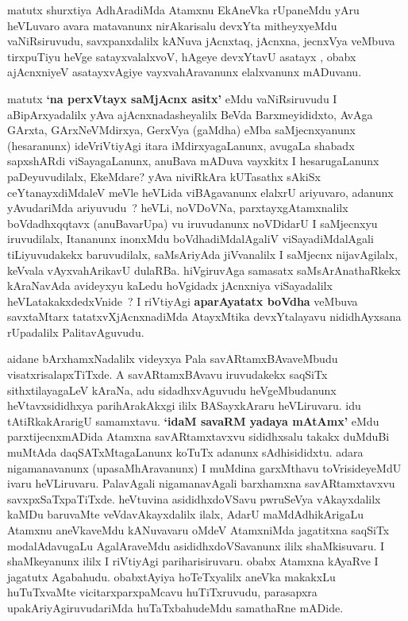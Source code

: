 \begin{artha}
matutx shurxtiya AdhAradiMda Atamxnu EkAneVka rUpaneMdu yAru heVLuvaro avara 
matavanunx nirAkarisalu devxYta mitheyxyeMdu vaNiRsiruvudu, savxpanxdalilx 
kANuva jAcnxtaq, jAcnxna, jecnxVya veMbuva tirxpuTiyu heVge satayxvalalxvoV, 
hAgeye devxYtavU asatayx , obabx ajAcnxniyeV asatayxvAgiye  vayxvahAravanunx 
elalxvanunx mADuvanu. 

matutx \textbf{`na perxVtayx saMjAcnx asitx'} eMdu vaNiRsiruvudu I aBipArxyadalilx \mdash  yAva ajAcnxnadasheyalilx 
BeVda Barxmeyididxto, AvAga GArxta, GArxNeVMdirxya, GerxVya (gaMdha) eMba 
saMjecnxyanunx (hesaranunx) ideVriVtiyAgi itara iMdirxyagaLanunx, avugaLa 
shabadx sapxshARdi viSayagaLanunx, anuBava mADuva vayxkitx I hesarugaLanunx paDeyuvudilalx,
EkeMdare? yAva niviRkAra kUTasathx sAkiSx ceYtanayxdiMdaleV meVle heVLida viBAgavanunx 
elalxrU ariyuvaro, adanunx yAvudariMda ariyuvudu~? heVLi, noVDoVNa, parxtayxgAtamxnalilx 
boVdadhxqqtavx (anuBavarUpa) vu iruvudanunx  noVDidarU I saMjecnxyu iruvudilalx, Itananunx 
inonxMdu boVdhadiMdalAgaliV viSayadiMdalAgali tiLiyuvudakekx baruvudilalx, saMsAriyAda 
jiVvanalilx I saMjecnx nijavAgilalx, keVvala vAyxvahArikavU dulaRBa. hiVgiruvAga samasatx 
saMsArAnathaRkekx kAraNavAda avideyxyu kaLedu hoVgidadx jAcnxniya viSayadalilx 
heVLatakakxdedxVnide~? I riVtiyAgi \textbf{aparAyatatx boVdha} veMbuva savxtaMtarx 
tatatxvXjAcnxnadiMda AtayxMtika devxYtalayavu nididhAyxsana rUpadalilx PalitavAguvudu.
\end{artha}


\centerline{}

\begin{artha}
aidane bArxhamxNadalilx videyxya Pala savARtamxBAvaveMbudu visatxrisalapxTiTxde. A savARtamxBAvavu iruvudakekx saqSiTx sithxtilayagaLeV kAraNa, adu sidadhxvAguvudu heVgeMbudanunx heVtavxsididhxya parihArakAkxgi ililx BASayxkAraru heVLiruvaru. idu tAtiRkakArarigU samamxtavu. \textbf{`idaM savaRM yadaya mAtAmx'} eMdu parxtijecnxmADida Atamxna savARtamxtavxvu sididhxsalu takakx duMduBi muMtAda daqSATxMtagaLanunx koTuTx adanunx sAdhisididxtu. adara nigamanavanunx (upasaMhAravanunx) I muMdina garxMthavu toVrisideyeMdU ivaru heVLiruvaru. PalavAgali nigamanavAgali barxhamxna savARtamxtavxvu savxpxSaTxpaTiTxde. heVtuvina asididhxdoVSavu pwruSeVya vAkayxdalilx kaMDu baruvaMte veVdavAkayxdalilx ilalx, AdarU maMdAdhikArigaLu Atamxnu aneVkaveMdu kANuvavaru oMdeV AtamxniMda jagatitxna saqSiTx modalAdavugaLu AgalAraveMdu asididhxdoVSavanunx ililx shaMkisuvaru. I shaMkeyanunx ililx I riVtiyAgi pariharisiruvaru. obabx Atamxna kAyaRve I jagatutx Agabahudu. obabxtAyiya hoTeTxyalilx aneVka makakxLu huTuTxvaMte vicitarxparxpaMcavu huTiTxruvudu, parasapxra upakAriyAgiruvudariMda huTaTxbahudeMdu samathaRne mADide.
\end{artha}

